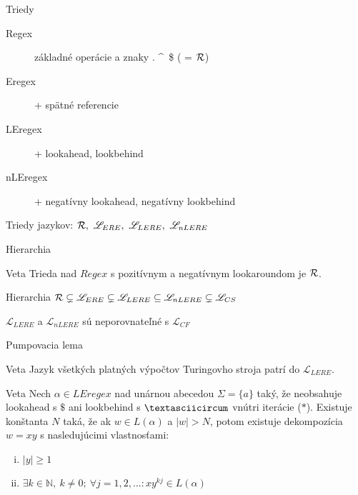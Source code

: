 \documentclass[mathserif]{beamer}
\def\R{{\cal R}} %
\def\L{\mathscr{L}} %
\def\N{\mathds{N}} %
\def\re{Regex}
\def\le{LEregex}
\def\el{\mathscr{L}_{ERE}}
\def\lel{\mathscr{L}_{LERE}}
\def\nlel{\mathscr{L}_{nLERE}}
\begin{document}
\begin{frame}{Triedy}
\begin{description}
\item[Regex] základné operácie a znaky . \textasciicircum ~\$ ( = $\R$)
\item[Eregex] + spätné referencie
\item[LEregex] + lookahead, lookbehind
\item[nLEregex] + negatívny lookahead, negatívny lookbehind
\end{description}
\vspace{30pt}
Triedy jazykov: $\R,~\el,~\lel,~\nlel$
\end{frame}

\begin{frame}{Hierarchia}
\begin{block}{Veta}
Trieda nad $\re$ s pozitívnym a negatívnym lookaroundom je $\R$.
\end{block}

\vspace{15pt}

\begin{block}{Hierarchia}
$\R \subsetneq \el \subsetneq \lel \subseteq \nlel \subsetneq \L_{CS}$
\end{block}
\begin{block}{}
$\lel$ a $\nlel$ sú neporovnateľné s $\L_{CF}$
\end{block}

\end{frame}

\begin{frame}{Pumpovacia lema}
\begin{block}{Veta}
Jazyk všetkých platných výpočtov Turingovho stroja patrí do $\lel$.
\end{block}

\begin{block}{Veta}
Nech $\alpha\in\le$ nad unárnou abecedou $\Sigma = \lbrace a \rbrace$ taký, že neobsahuje lookahead s $\mathdollar$ ani lookbehind s $\textasciicircum$ vnútri iterácie ($*$). Existuje konštanta $N$ taká, že ak $w \in L(\alpha)$ a $\vert w \vert > N$, potom existuje dekompozícia $w=xy$ s nasledujúcimi vlastnosťami:
\begin{enumerate}[(i)]
\item $\vert y \vert \geq 1$
\item $\exists k \in \N,~k\neq 0;~\forall j = 1,2,\ldots: xy^{kj} \in L(\alpha)$
\end{enumerate}
\end{block}
\end{frame}
\end{document}
